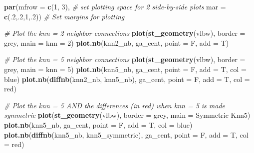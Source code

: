 \documentclass[
]{book}
\newenvironment{Shaded}{\begin{snugshade}}{\end{snugshade}}
\newcommand{\AttributeTok}[1]{\textcolor[rgb]{0.13,0.29,0.53}{#1}}
\newcommand{\CommentTok}[1]{\textcolor[rgb]{0.56,0.35,0.01}{\textit{#1}}}
\newcommand{\DecValTok}[1]{\textcolor[rgb]{0.00,0.00,0.81}{#1}}
\newcommand{\FunctionTok}[1]{\textcolor[rgb]{0.13,0.29,0.53}{\textbf{#1}}}
\newcommand{\NormalTok}[1]{#1}
\newcommand{\StringTok}[1]{\textcolor[rgb]{0.31,0.60,0.02}{#1}}
\begin{document}
\begin{Shaded}
\begin{Highlighting}[]
\FunctionTok{par}\NormalTok{(}\AttributeTok{mfrow =} \FunctionTok{c}\NormalTok{(}\DecValTok{1}\NormalTok{, }\DecValTok{3}\NormalTok{),        }\CommentTok{\# set plotting space for 2 side{-}by{-}side plots}
    \AttributeTok{mar =} \FunctionTok{c}\NormalTok{(.}\DecValTok{2}\NormalTok{,.}\DecValTok{2}\NormalTok{,}\DecValTok{1}\NormalTok{,.}\DecValTok{2}\NormalTok{))    }\CommentTok{\# Set margins for plotting}

\CommentTok{\# Plot the knn = 2 neighbor connections}
\FunctionTok{plot}\NormalTok{(}\FunctionTok{st\_geometry}\NormalTok{(vlbw), }\AttributeTok{border =} \StringTok{\textquotesingle{}grey\textquotesingle{}}\NormalTok{, }\AttributeTok{main =} \StringTok{\textquotesingle{}knn = 2\textquotesingle{}}\NormalTok{)}
\FunctionTok{plot.nb}\NormalTok{(knn2\_nb, ga\_cent, }\AttributeTok{point =}\NormalTok{ F, }\AttributeTok{add =}\NormalTok{ T)}

\CommentTok{\# Plot the knn = 5 neighbor connections}
\FunctionTok{plot}\NormalTok{(}\FunctionTok{st\_geometry}\NormalTok{(vlbw), }\AttributeTok{border =} \StringTok{\textquotesingle{}grey\textquotesingle{}}\NormalTok{, }\AttributeTok{main =} \StringTok{\textquotesingle{}knn = 5\textquotesingle{}}\NormalTok{)}
\FunctionTok{plot.nb}\NormalTok{(knn5\_nb, ga\_cent, }\AttributeTok{point =}\NormalTok{ F, }\AttributeTok{add =}\NormalTok{ T, }\AttributeTok{col =} \StringTok{\textquotesingle{}blue\textquotesingle{}}\NormalTok{)}
\FunctionTok{plot.nb}\NormalTok{(}\FunctionTok{diffnb}\NormalTok{(knn2\_nb, knn5\_nb), ga\_cent, }\AttributeTok{point =}\NormalTok{ F, }\AttributeTok{add =}\NormalTok{ T, }\AttributeTok{col =} \StringTok{\textquotesingle{}red\textquotesingle{}}\NormalTok{)}

\CommentTok{\# Plot the knn = 5 AND the differences (in red) when knn = 5 is made symmetric}
\FunctionTok{plot}\NormalTok{(}\FunctionTok{st\_geometry}\NormalTok{(vlbw), }\AttributeTok{border =} \StringTok{\textquotesingle{}grey\textquotesingle{}}\NormalTok{, }\AttributeTok{main =} \StringTok{\textquotesingle{}Symmetric Knn5\textquotesingle{}}\NormalTok{)}
\FunctionTok{plot.nb}\NormalTok{(knn5\_nb, ga\_cent, }\AttributeTok{point =}\NormalTok{ F, }\AttributeTok{add =}\NormalTok{ T, }\AttributeTok{col =} \StringTok{\textquotesingle{}blue\textquotesingle{}}\NormalTok{)}
\FunctionTok{plot.nb}\NormalTok{(}\FunctionTok{diffnb}\NormalTok{(knn5\_nb, knn5\_symmetric), ga\_cent, }\AttributeTok{point =}\NormalTok{ F, }\AttributeTok{add =}\NormalTok{ T, }\AttributeTok{col =} \StringTok{\textquotesingle{}red\textquotesingle{}}\NormalTok{)}
\end{Highlighting}
\end{Shaded}
\end{document}
